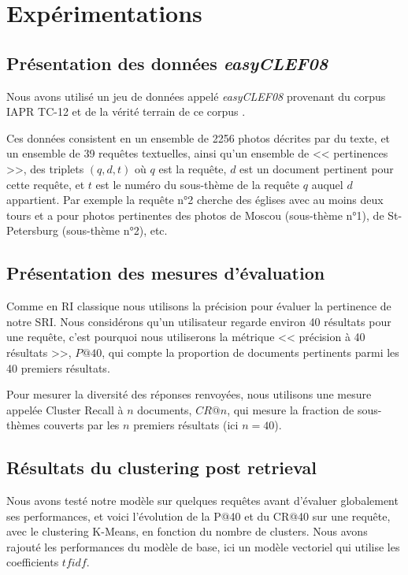 \documentclass{article}
\begin{document}
\section{Expérimentations}
\subsection{Présentation des données \textit{easyCLEF08}}
Nous avons utilisé un jeu de données appelé \textit{easyCLEF08} provenant du corpus IAPR TC-12 \cite{grubinger06} et de la vérité terrain de ce corpus \cite{arni08}. 

Ces données consistent en un ensemble de 2256 photos décrites par du texte, et un ensemble de 39 requêtes textuelles, ainsi qu'un ensemble de << pertinences >>, des triplets $(q,d,t)$ où $q$ est la requête, $d$ est un document pertinent pour cette requête, et $t$ est le numéro du sous-thème de la requête $q$ auquel $d$ appartient.
Par exemple la requête n°2 cherche des églises avec au moins deux tours et a pour photos pertinentes des photos de Moscou (sous-thème n°1), de St-Petersburg (sous-thème n°2), etc.

\subsection{Présentation des mesures d'évaluation}
Comme en RI classique nous utilisons la précision pour évaluer la pertinence de notre SRI. Nous considérons qu'un utilisateur regarde environ 40 résultats pour une requête, c'est pourquoi nous utiliserons la métrique << précision à 40 résultats >>, $P@40$, qui compte la proportion de documents pertinents parmi les 40 premiers résultats.

Pour mesurer la diversité des réponses renvoyées, nous utilisons une mesure appelée Cluster Recall à $n$ documents, $CR@n$, qui mesure la fraction de sous-thèmes couverts par les $n$ premiers résultats (ici $n=40$).


\subsection{Résultats du clustering post retrieval}

Nous avons testé notre modèle sur quelques requêtes avant d'évaluer globalement ses performances, et voici l'évolution de la P@40 et du CR@40 sur une requête, avec le clustering K-Means, en fonction du nombre de clusters. Nous avons rajouté les performances du modèle de base, ici un modèle vectoriel qui utilise les coefficients $tfidf$.
\end{document}
